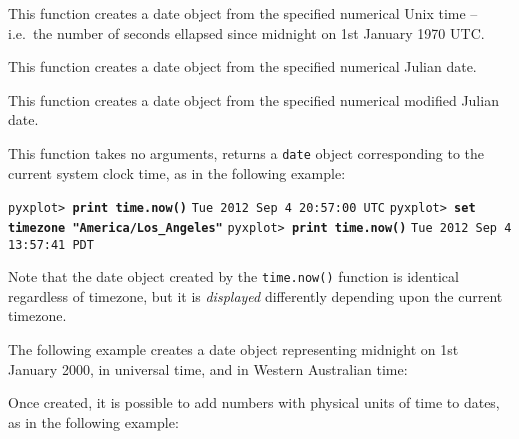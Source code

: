 \vspace{2mm}\vspace{2mm}

\noindent This function creates a date object from the specified numerical Unix time -- i.e.\ the number of seconds ellapsed since midnight on 1st January 1970 UTC.

\vspace{2mm}\vspace{2mm}

\noindent This function creates a date object from the specified numerical
Julian date.

\vspace{2mm}\vspace{2mm}

\noindent This function creates a date object from the
specified numerical modified Julian date.

\vspace{2mm}\vspace{2mm}

This function takes no arguments, returns a {\tt date} object corresponding to
the current system clock time, as in the following example:

\vspace{3mm}
\noindent\texttt{pyxplot> \textbf{print time.now()}}\newline
\noindent\texttt{Tue 2012 Sep 4 20:57:00 UTC}\newline
\noindent\texttt{pyxplot> \textbf{set timezone "America/Los\_Angeles"}}\newline
\noindent\texttt{pyxplot> \textbf{print time.now()}}\newline
\noindent\texttt{Tue 2012 Sep 4 13:57:41 PDT}\newline
\vspace{3mm}

Note that the date object created by the {\tt time.now()} function is identical
regardless of timezone, but it is {\it displayed} differently depending upon
the current timezone.

The following example creates a date object representing midnight on 1st
January 2000, in universal time, and in Western Australian time:

\vspace{3mm}

\vspace{3mm}

Once created, it is possible to add numbers with physical units of time to
dates, as in the following example:

